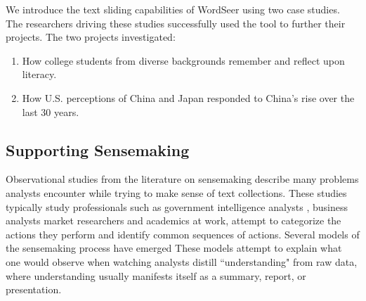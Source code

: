 \documentclass{sig-alternate}
\begin{document}
We introduce the text sliding capabilities of WordSeer using two case studies. The researchers driving these studies successfully used the tool to further their projects. The two projects investigated:
\begin{enumerate}
	\item How college students from diverse backgrounds remember and reflect upon literacy.
	\item How U.S. perceptions of China and Japan responded to China's rise over the last 30 years.
\end{enumerate}


\subsection{Supporting Sensemaking}

Observational studies from the literature on sensemaking describe many problems analysts encounter while trying to make sense of text collections. These studies typically study professionals such as government intelligence analysts \cite{x}, business analysts \cite{x} market researchers \cite{x} and academics \cite{x} at work, attempt to categorize the actions they perform and identify common sequences of actions. Several models of the sensemaking process have emerged \cite{x} These models attempt to explain what one would observe when watching analysts distill ``understanding" from raw data, where understanding usually manifests itself as a summary, report, or presentation.
\end{document}

